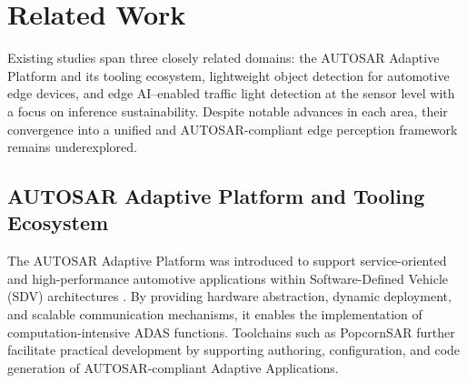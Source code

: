 

\section{Related Work}
\label{sec:related_work}

Existing studies span three closely related domains: the AUTOSAR Adaptive Platform and its tooling ecosystem, lightweight object detection for automotive edge devices, and edge AI–enabled traffic light detection at the sensor level with a focus on inference sustainability. Despite notable advances in each area, their convergence into a unified and AUTOSAR-compliant edge perception framework remains underexplored.

\subsection{AUTOSAR Adaptive Platform and Tooling Ecosystem}
The AUTOSAR Adaptive Platform was introduced to support service-oriented and high-performance automotive applications within Software-Defined Vehicle (SDV) architectures \cite{autosar_r21_11}\cite{autosar_ap_platform_design_r21_11}. By providing hardware abstraction, dynamic deployment, and scalable communication mechanisms, it enables the implementation of computation-intensive ADAS functions. Toolchains such as PopcornSAR further facilitate practical development by supporting authoring, configuration, and code generation of AUTOSAR-compliant Adaptive Applications. 

